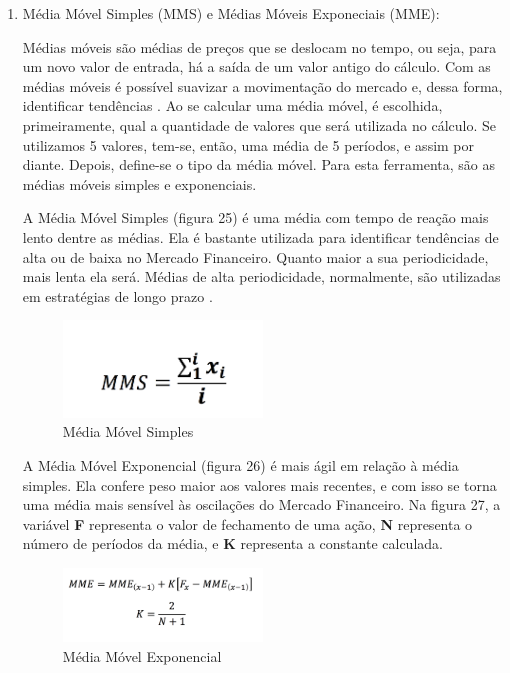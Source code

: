 \begin{description}
\begin{itemize}
\begin{enumerate}
\item Média Móvel Simples (MMS) e Médias Móveis Exponeciais (MME):\newline

Médias móveis são médias de preços que se deslocam no tempo, ou seja, para um novo valor de entrada, há a saída de um valor antigo do cálculo. Com as médias móveis é possível suavizar a movimentação do mercado e, dessa forma, identificar tendências \cite[p.68]{matsura2006}. Ao se calcular uma média móvel, é escolhida, primeiramente, qual a quantidade de valores que será utilizada no cálculo. Se utilizamos 5 valores, tem-se, então, uma média de 5 períodos, e assim por diante. Depois, define-se o tipo da média móvel. Para esta ferramenta, são as médias móveis simples e exponenciais.

A Média Móvel Simples (figura 25) é uma média com tempo de reação mais lento dentre as médias. Ela é bastante utilizada para identificar tendências de alta ou de baixa no Mercado Financeiro. Quanto maior a sua periodicidade, mais lenta ela será. Médias de alta periodicidade, normalmente, são utilizadas em estratégias de longo prazo \cite[p. 69]{matsura2006}.

\begin{figure}[h]
\centering
\label{f25}
\includegraphics[width=0.5\textwidth]{figuras/f22}
\caption{Média Móvel Simples}
\end{figure}

A Média Móvel Exponencial (figura 26) é mais ágil em relação à média simples. Ela confere peso maior aos valores mais recentes, e com isso se torna uma média mais sensível às oscilações do Mercado Financeiro. Na figura 27, a variável \textbf{F} representa o valor de fechamento de uma ação, \textbf{N} representa o número de períodos da média, e \textbf{K} representa a constante calculada.

\begin{figure}[h]
\centering
\label{f26}
\includegraphics[width=0.5\textwidth]{figuras/f23}
\caption{Média Móvel Exponencial}
\end{figure}
\FloatBarrier


\end{enumerate}
\end{itemize}
\end{description}

